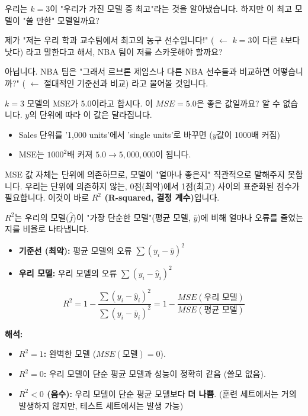 \documentclass[11pt,a4paper]{book}
\theoremstyle{definition}
\begin{document}
우리는 $k=3$이 "우리가 가진 모델 중 최고"라는 것을 알아냈습니다.
하지만 이 최고 모델이 "쓸 만한" 모델일까요?

\begin{analogybox}[title={NBA 선수 선발 비유}]
제가 "저는 우리 학과 교수팀에서 최고의 농구 선수입니다!" ( $\leftarrow$ $k=3$이 다른 $k$보다 낫다)
라고 말한다고 해서, NBA 팀이 저를 스카웃해야 할까요?

아닙니다. NBA 팀은 "그래서 르브론 제임스나 다른 NBA 선수들과 비교하면 어떻습니까?" ( $\leftarrow$ 절대적인 기준선과 비교)
라고 물어볼 것입니다.
\end{analogybox}

$k=3$ 모델의 MSE가 5.0이라고 합시다. 이 $MSE=5.0$은 좋은 값일까요?
알 수 없습니다. $y$의 단위에 따라 이 값은 달라집니다.

\begin{itemize}
    \item Sales 단위를 '1,000 units'에서 'single units'로 바꾸면 ($y$값이 1000배 커짐)
    \item MSE는 $1000^2$배 커져 $5.0 \rightarrow 5,000,000$이 됩니다.
\end{itemize}

MSE 값 자체는 단위에 의존하므로, 모델이 "얼마나 좋은지" 직관적으로 말해주지 못합니다.
우리는 단위에 의존하지 않는, 0점(최악)에서 1점(최고) 사이의 표준화된 점수가 필요합니다.
이것이 바로 \textbf{$R^2$ (R-squared, 결정 계수)}입니다.

\begin{defbox}[title={$R^2$ (R-squared)}]
$R^2$는 우리의 모델($\hat{f}$)이 "가장 단순한 모델"(평균 모델, $\bar{y}$)에 비해 얼마나 오류를 줄였는지를 비율로 나타냅니다.

\begin{itemize}
    \item \textbf{기준선 (최악):} 평균 모델의 오류 $\sum (y_i - \bar{y})^2$
    \item \textbf{우리 모델:} 우리 모델의 오류 $\sum (y_i - \hat{y}_i)^2$
\end{itemize}

$$ R^2 = 1 - \frac{\sum (y_i - \hat{y}_i)^2}{\sum (y_i - \bar{y}_i)^2} = 1 - \frac{MSE(\text{우리 모델})}{MSE(\text{평균 모델})} $$

\textbf{해석:}
\begin{itemize}
    \item \textbf{$R^2 = 1$:} 완벽한 모델 ($MSE(\text{모델})=0$).
    \item \textbf{$R^2 = 0$:} 우리 모델이 단순 평균 모델과 성능이 정확히 같음 (쓸모 없음).
    \item \textbf{$R^2 < 0$ (음수):} 우리 모델이 단순 평균 모델보다 \textbf{더 나쁨}. (훈련 세트에서는 거의 발생하지 않지만, 테스트 세트에서는 발생 가능)
\end{itemize}
\end{defbox}
\end{document}
